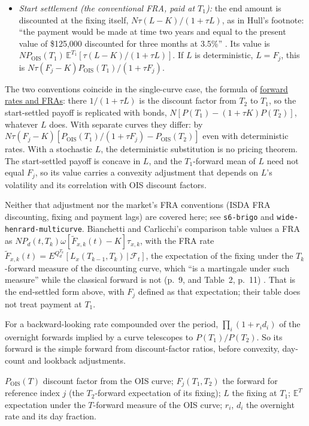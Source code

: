\begin{qfmodel}
\begin{itemize}
\item \emph{Start settlement (the conventional FRA, paid at $T_1$):} the end amount is discounted at the fixing itself, $N\tau(L-K)/(1+\tau L)$, as in Hull's footnote: ``the payment would be made at time two years and equal to the present value of \$125{,}000 discounted for three months at 3.5\%'' \citep[chap.~4, sec.~4.9, p.~111, n.~4]{s7-hulloptions}. Its value is $N P_{\mathrm{OIS}}(T_1)\,\mathbb{E}^{T_1}[\tau(L-K)/(1+\tau L)]$. If $L$ is deterministic, $L=F_j$, this is $N\tau(F_j-K)P_{\mathrm{OIS}}(T_1)/(1+\tau F_j)$.
\end{itemize}
The two conventions coincide in the single-curve case, the formula of \hyperref[mod:forward-rates-fra]{forward rates and FRAs}: there $1/(1+\tau L)$ is the discount factor from $T_2$ to $T_1$, so the start-settled payoff is replicated with bonds, $N[P(T_1)-(1+\tau K)P(T_2)]$, whatever $L$ does. With separate curves they differ: by $N\tau(F_j-K)[P_{\mathrm{OIS}}(T_1)/(1+\tau F_j)-P_{\mathrm{OIS}}(T_2)]$ even with deterministic rates. With a stochastic $L$, the deterministic substitution is no pricing theorem. The start-settled payoff is concave in $L$, and the $T_1$-forward mean of $L$ need not equal $F_j$, so its value carries a convexity adjustment that depends on $L$'s volatility and its correlation with OIS discount factors.

Neither that adjustment nor the market's FRA conventions (ISDA FRA discounting, fixing and payment lags) are covered here; see \nolinkurl{s6-brigo} and \nolinkurl{wide-henrard-multicurve}. Bianchetti and Carlicchi's comparison table values a FRA as $NP_d(t,T_k)\omega[\tilde F_{x,k}(t)-K]\tau_{x,k}$, with the FRA rate $\tilde F_{x,k}(t)=E^{Q_d^{T_k}}[L_x(T_{k-1},T_k)\,|\,\mathcal F_t]$, the expectation of the fixing under the $T_k$-forward measure of the discounting curve, which ``is a martingale under such measure'' while the classical forward is not (p.~9, and Table~2, p.~11) \citep[arXiv 1103.2567, version of 28 March 2012, Table~2, p.~11]{gap-rates-multicurve-sabr}. That is the end-settled form above, with $F_j$ defined as that expectation; their table does not treat payment at $T_1$.

For a backward-looking rate compounded over the period, $\prod_i(1+r_id_i)$ of the overnight forwards implied by a curve telescopes to $P(T_1)/P(T_2)$. So its forward is the simple forward from discount-factor ratios, before convexity, day-count and lookback adjustments.

 $P_{\mathrm{OIS}}(T)$ discount factor from the OIS curve; $F_j(T_1,T_2)$ the forward for reference index $j$ (the $T_2$-forward expectation of its fixing); $L$ the fixing at $T_1$; $\mathbb{E}^{T}$ expectation under the $T$-forward measure of the OIS curve; $r_i$, $d_i$ the overnight rate and its day fraction.


\end{qfmodel}
